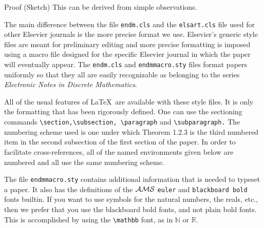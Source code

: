 \documentclass{endm}
\newcommand{\Nat}{{\mathbb N}}
\newcommand{\Real}{{\mathbb R}}
\begin{document}
\begin{proof*}{Proof (Sketch)}
This can be derived from simple observations.
\end{proof*}

The main difference between the file \texttt{endm.cls} and the
\texttt{elsart.cls} file used for other Elsevier journals is the more
precise format we use. Elsevier's generic style files are meant for
preliminary editing and more precise formatting is imposed using a macro
file designed for the specific Elsevier journal in which the paper will
eventually appear. The \texttt{endm.cls} and \texttt{endmmacro.sty} files
format papers uniformly so that they all are easily recognizable as
belonging to the series \emph{Electronic Notes in Discrete Mathematics}.

All of the usual features of \LaTeX\ are available with these style files.
It is only the formatting that has been rigorously defined. One can use
the sectioning commands \verb+\section,\subsection, \paragraph+
and \verb+\subparagraph.+ The numbering scheme used is one under which
Theorem 1.2.3 is the third numbered item in the second subsection of the
first section of the paper. In order to facilitate cross-references, all
of the named environments given below are numbered and all use the same
numbering scheme.

The file \texttt{endmmacro.sty} contains additional information that is
needed to typeset a paper. It also has the definitions of the $\cal AMS$
\texttt{euler} and \texttt{blackboard bold} fonts builtin. If you want to
use symbols for the natural numbers, the reals, etc., then we prefer that
you use the blackboard bold fonts, and not plain bold fonts. This is
accomplished by using the \verb+\mathbb+ font, as in $\Nat$ or $\Real$.
\end{document}
